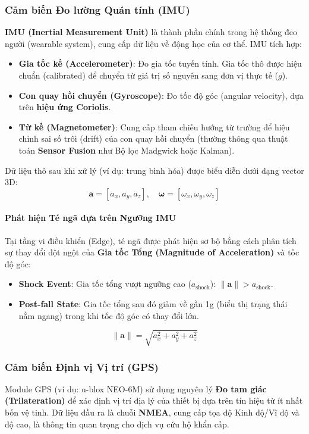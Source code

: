 \subsubsection{Cảm biến Đo lường Quán tính (IMU)}
\textbf{IMU (Inertial Measurement Unit)} là thành phần chính trong hệ thống đeo người (wearable system), cung cấp dữ liệu về động học của cơ thể. IMU tích hợp:
\begin{itemize}
    \item \textbf{Gia tốc kế (Accelerometer)}: Đo gia tốc tuyến tính. Gia tốc thô được hiệu chuẩn (calibrated) để chuyển từ giá trị số nguyên sang đơn vị thực tế ($g$).
    \item \textbf{Con quay hồi chuyển (Gyroscope)}: Đo tốc độ góc (angular velocity), dựa trên \textbf{hiệu ứng Coriolis}.
    \item \textbf{Từ kế (Magnetometer)}: Cung cấp tham chiếu hướng từ trường để hiệu chỉnh sai số trôi (drift) của con quay hồi chuyển (thường thông qua thuật toán \textbf{Sensor Fusion} như Bộ lọc Madgwick hoặc Kalman).
\end{itemize}

Dữ liệu thô sau khi xử lý (ví dụ: trung bình hóa) được biểu diễn dưới dạng vector 3D:
\[
\mathbf{a} = [a_x, a_y, a_z], \quad
\boldsymbol{\omega} = [\omega_x, \omega_y, \omega_z]
\]

\paragraph{Phát hiện Té ngã dựa trên Ngưỡng IMU}
Tại tầng vi điều khiển (Edge), té ngã được phát hiện sơ bộ bằng cách phân tích sự thay đổi đột ngột của \textbf{Gia tốc Tổng (Magnitude of Acceleration)} và tốc độ góc:
\begin{itemize}
    \item \textbf{Shock Event}: Gia tốc tổng vượt ngưỡng cao ($a_{\text{shock}}$): $\|\mathbf{a}\| > a_{\text{shock}}$.
    \item \textbf{Post-fall State}: Gia tốc tổng sau đó giảm về gần 1g (biểu thị trạng thái nằm ngang) trong khi tốc độ góc có thay đổi lớn.
\end{itemize}
\[
\|\mathbf{a}\| = \sqrt{a_x^2 + a_y^2 + a_z^2}
\]

\subsubsection{Cảm biến Định vị Vị trí (GPS)}
Module GPS (ví dụ: u-blox NEO-6M) sử dụng nguyên lý \textbf{Đo tam giác (Trilateration)} để xác định vị trí địa lý của thiết bị dựa trên tín hiệu từ ít nhất bốn vệ tinh. Dữ liệu đầu ra là chuỗi \textbf{NMEA}, cung cấp tọa độ Kinh độ/Vĩ độ và độ cao, là thông tin quan trọng cho dịch vụ cứu hộ khẩn cấp.

